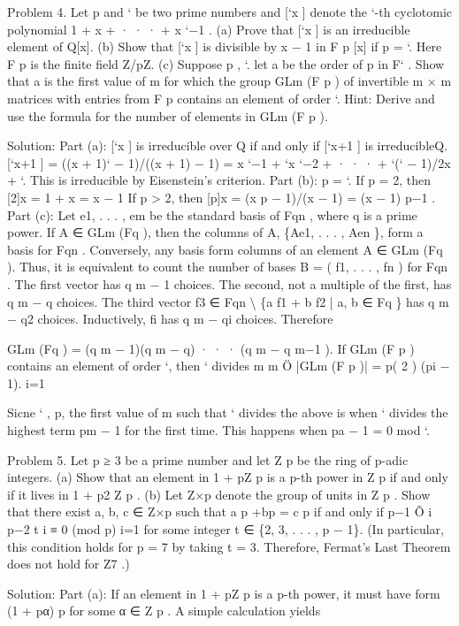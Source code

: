 \documentclass[UTF8,12pt]{ctexart}
\begin{document}
Problem 4. Let p and ` be two prime numbers and [`x ] denote the `-th cyclotomic polynomial 1 + x + · · · + x `−1 . (a) Prove that [`x ] is an irreducible element of Q[x]. (b) Show that [`x ] is divisible by x − 1 in F p [x] if p = `. Here F p is the finite field Z/pZ. (c) Suppose p , `. let a be the order of p in F` . Show that a is the first value of m for which the group GLm (F p ) of invertible m × m matrices with entries from F p contains an element of order `. Hint: Derive and use the formula for the number of elements in GLm (F p ).

Solution: Part (a): [`x ] is irreducible over Q if and only if [`x+1 ] is irreducibleQ. [`x+1 ] = ((x + 1)` − 1)/((x + 1) − 1) = x `−1 + `x `−2 + · · · + `(` − 1)/2x + `. This is irreducible by Eisenstein’s criterion. Part (b): p = `. If p = 2, then [2]x = 1 + x = x − 1 If p > 2, then [p]x = (x p − 1)/(x − 1) = (x − 1) p−1 . Part (c): Let e1, . . . , em be the standard basis of Fqn , where q is a prime power. If A ∈ GLm (Fq ), then the columns of A, \{Ae1, . . . , Aen \}, form a basis for Fqn . Conversely, any basis form columns of an element A ∈ GLm (Fq ). Thus, it is equivalent to count the number of bases B = ( f1, . . . , fn ) for Fqn . The first vector has q m − 1 choices. The second, not a multiple of the first, has q m − q choices. The third vector f3 ∈ Fqn \textbackslash{} \{a f1 + b f2 | a, b ∈ Fq \} has q m − q2 choices. Inductively, fi has q m − qi choices. Therefore

GLm (Fq ) = (q m − 1)(q m − q) · · · (q m − q m−1 ). If GLm (F p ) contains an element of order `, then ` divides m m Ö |GLm (F p )| = p( 2 ) (pi − 1). i=1

Sicne ` , p, the first value of m such that ` divides the above is when ` divides the highest term pm − 1 for the first time. This happens when pa − 1 = 0 mod `.

Problem 5. Let p ≥ 3 be a prime number and let Z p be the ring of p-adic integers. (a) Show that an element in 1 + pZ p is a p-th power in Z p if and only if it lives in 1 + p2 Z p . (b) Let Z×p denote the group of units in Z p . Show that there exist a, b, c ∈ Z×p such that a p +bp = c p if and only if p−1 Õ i p−2 t i ≡ 0 (mod p) i=1 for some integer t ∈ \{2, 3, . . . , p − 1\}. (In particular, this condition holds for p = 7 by taking t = 3. Therefore, Fermat’s Last Theorem does not hold for Z7 .)

Solution: Part (a): If an element in 1 + pZ p is a p-th power, it must have form (1 + pα) p for some α ∈ Z p . A simple calculation yields
\end{document}
